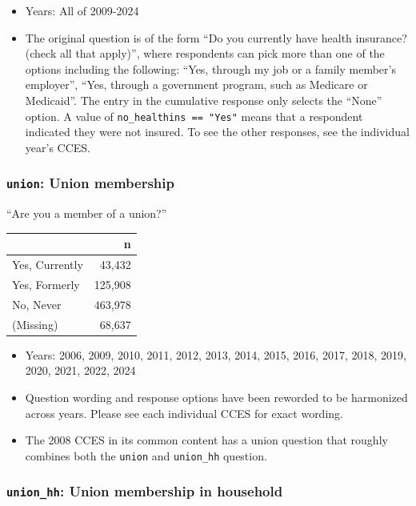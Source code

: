 \documentclass[10pt,article,oneside]{memoir}
\begin{document}
\begin{itemize}
\tightlist
\item
  Years: All of 2009-2024
\item
  The original question is of the form ``Do you currently have health
  insurance? (check all that apply)'', where respondents can pick more
  than one of the options including the following: ``Yes, through my job
  or a family member's employer'', ``Yes, through a government program,
  such as Medicare or Medicaid''. The entry in the cumulative response
  only selects the ``None'' option. A value of
  \texttt{no\_healthins\ ==\ "Yes"} means that a respondent indicated
  they were not insured. To see the other responses, see the individual
  year's CCES.
\end{itemize}

\subsubsection{\texorpdfstring{\texttt{union}: Union
membership}{union: Union membership}}\label{union-union-membership}

``Are you a member of a union?''

\begin{table}[H]
\centering
\begin{tabular}[t]{lr}
\toprule
 & n\\
\midrule
Yes, Currently & 43,432\\
Yes, Formerly & 125,908\\
No, Never & 463,978\\
(Missing) & 68,637\\
\bottomrule
\end{tabular}
\end{table}

\begin{itemize}
\tightlist
\item
  Years: 2006, 2009, 2010, 2011, 2012, 2013, 2014, 2015, 2016, 2017,
  2018, 2019, 2020, 2021, 2022, 2024
\item
  Question wording and response options have been reworded to be
  harmonized across years. Please see each individual CCES for exact
  wording.
\item
  The 2008 CCES in its common content has a union question that roughly
  combines both the \texttt{union} and \texttt{union\_hh} question.
\end{itemize}

\subsubsection{\texorpdfstring{\texttt{union\_hh}: Union membership in
household}{union\_hh: Union membership in household}}\label{union_hh-union-membership-in-household}
\end{document}
